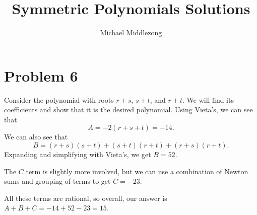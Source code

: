 \documentclass{scrartcl}
\title{Symmetric Polynomials Solutions}
\author{Michael Middlezong}
\begin{document}
\maketitle

\section*{Problem 6}
Consider the polynomial with roots $r + s$, $s + t$, and $r + t$. We will find its coefficients and show that it is the desired polynomial.
Using Vieta's, we can see that
\[A = -2(r + s + t) = -14.\]
We can also see that
\[B = (r + s)(s + t) + (s + t)(r + t) + (r + s)(r + t).\]
Expanding and simplifying with Vieta's, we get $B = 52$.

The $C$ term is slightly more involved, but we can use a combination of Newton sums and grouping of terms to get $C = -23$.

All these terms are rational, so overall, our answer is $A + B + C = -14 + 52 - 23 = 15$.
\end{document}
